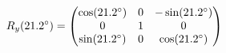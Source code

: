 \documentclass[preview]{standalone}
\begin{document}
\begin{align*}
\special{dvisvgm:raw <g id='unique000'>}R_y(21.2^\circ) = \begin{pmatrix} \cos(21.2^\circ) & 0 & -\sin(21.2^\circ) \\ 0 & 1 & 0 \\ \sin(21.2^\circ) & 0 & \cos(21.2^\circ) \end{pmatrix}\special{dvisvgm:raw </g>}
\end{align*}
\end{document}
